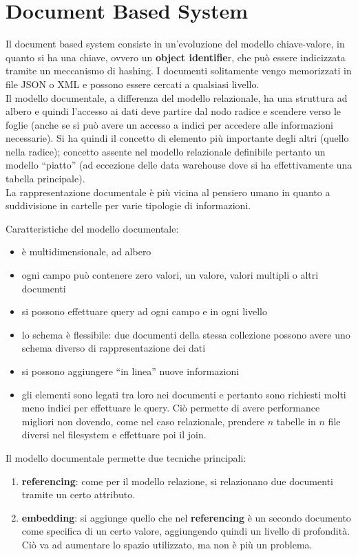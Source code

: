 \section{Document Based System}
Il document based system consiste in un’evoluzione del modello chiave-valore, in quanto si ha una chiave, ovvero un \textbf{object identifie}r, che può essere indicizzata tramite un meccanismo di hashing. I documenti solitamente vengo memorizzati in file JSON o XML e possono essere cercati a qualsiasi livello.\\
Il modello documentale, a differenza del modello relazionale, ha una struttura ad albero e quindi l’accesso ai dati deve partire dal nodo radice e scendere verso le foglie (anche se si può avere un accesso a indici per accedere alle informazioni necessarie). Si ha quindi il concetto di elemento più importante degli altri (quello nella radice); concetto assente nel modello relazionale definibile pertanto un modello “piatto” (ad eccezione delle data warehouse dove si ha effettivamente una tabella principale).\\
La rappresentazione documentale è più vicina al pensiero umano in quanto a suddivisione in cartelle per varie tipologie di informazioni.

Caratteristiche del modello documentale:
\begin{itemize}
    \item è multidimensionale, ad albero
    \item ogni campo può contenere zero valori, un valore, valori multipli o altri documenti
    \item si possono effettuare query ad ogni campo e in ogni livello
    \item lo schema è flessibile: due documenti della stessa collezione possono avere uno schema diverso di rappresentazione dei dati
    \item si possono aggiungere “in linea” nuove informazioni
    \item gli elementi sono legati tra loro nei documenti e pertanto sono richiesti molti meno indici per effettuare le query. 
    Ciò permette di avere performance migliori non dovendo, come nel caso relazionale, prendere $n$ tabelle in $n$ file diversi nel filesystem e effettuare poi il join.
\end{itemize}
Il modello documentale permette due tecniche principali:
\begin{enumerate}
    \item \textbf{referencing}: come per il modello relazione, si relazionano due documenti tramite un certo attributo.
    \item \textbf{embedding}: si aggiunge quello che nel \textbf{referencing} è un secondo documento come specifica di un certo valore, aggiungendo quindi un livello di profondità.  Ciò va ad aumentare lo spazio utilizzato, ma non è più un problema.
\end{enumerate}

